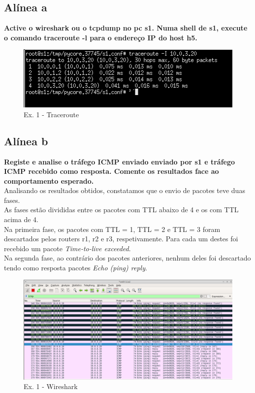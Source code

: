 \documentclass[a4paper]{report}
\begin{document}
\subsection{Alínea a}
\textbf{Active o wireshark ou o tcpdump no pc s1. Numa shell de s1, execute o
comando
traceroute -l para o endereço IP do host h5.}

\begin{figure}[H]
    \centering 
    \includegraphics[width=\textwidth]{images/traceroutEx1.png}  
    \caption{Ex. 1 - Traceroute}
    \label{fig:traceroutEx1}
\end{figure}
\subsection{Alínea b}
\textbf{Registe e analise o tráfego ICMP enviado enviado por s1 e tráfego ICMP
recebido como resposta. Comente os resultados face ao comportamento esperado.}\\
Analisando os resultados obtidos, constatamos que o envio de pacotes teve duas
fases.\\
As fases estão divididas entre os pacotes com TTL abaixo de 4 e os com TTL acima
de 4.\\
Na primeira fase, os pacotes com TTL = 1, TTL = 2 e TTL = 3 foram descartados
pelos routers r1, r2 e r3, respetivamente. Para cada um destes foi recebido um
pacote \textit{Time-to-live exceeded}.\\
Na segunda fase, ao contrário dos pacotes anteriores,
nenhum deles foi descartado tendo como resposta pacotes \textit{Echo (ping)
reply}.

\begin{figure}[H]
    \centering 
    \includegraphics[width=\textwidth]{images/wiresharkEx1.png}  
    \caption{Ex. 1 - Wireshark}
    \label{fig:wiresharkEx1}
\end{figure}
\end{document}

